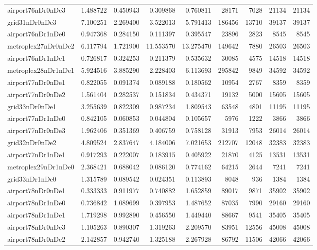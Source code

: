 \begin{longtable}{|l|r|r|r|r|r|r|r|r|}
airport76nDr0nDe3 & 1.488722 & 0.450943 & 0.309868 & 0.760811 & 28171 & 7028 & 21134 & 21134 \\
grid31nDr0nDe3 & 7.100251 & 2.269400 & 3.522013 & 5.791413 & 186456 & 13710 & 39137 & 39137 \\
airport76nDr1nDe0 & 0.947368 & 0.284150 & 0.111397 & 0.395547 & 23896 & 2823 & 8545 & 8545 \\
metroplex27nDr0nDe2 & 6.117794 & 1.721900 & 11.553570 & 13.275470 & 149642 & 7880 & 26503 & 26503 \\
airport76nDr1nDe1 & 0.726817 & 0.324253 & 0.211379 & 0.535632 & 30085 & 4575 & 14518 & 14518 \\
metroplex28nDr1nDe1 & 5.924516 & 3.885290 & 2.228403 & 6.113693 & 295842 & 9849 & 34592 & 34592 \\
airport77nDr0nDe1 & 0.822055 & 0.091374 & 0.089188 & 0.180562 & 10954 & 2767 & 8359 & 8359 \\
airport77nDr0nDe2 & 1.561404 & 0.282537 & 0.151834 & 0.434371 & 19132 & 5000 & 15605 & 15605 \\
grid33nDr0nDe1 & 3.255639 & 0.822309 & 0.987234 & 1.809543 & 63548 & 4801 & 11195 & 11195 \\
airport77nDr1nDe0 & 0.842105 & 0.060853 & 0.044804 & 0.105657 & 5976 & 1222 & 3866 & 3866 \\
airport77nDr0nDe3 & 1.962406 & 0.351369 & 0.406759 & 0.758128 & 31913 & 7953 & 26014 & 26014 \\
grid32nDr0nDe2 & 4.809524 & 2.837647 & 4.184006 & 7.021653 & 212707 & 12048 & 32383 & 32383 \\
airport77nDr1nDe1 & 0.917293 & 0.222007 & 0.183915 & 0.405922 & 21870 & 4125 & 13531 & 13531 \\
metroplex29nDr1nDe0 & 2.368421 & 0.688042 & 0.086120 & 0.774162 & 64215 & 2644 & 7241 & 7241 \\
grid33nDr1nDe0 & 1.315789 & 0.089542 & 0.024351 & 0.113893 & 8048 & 936 & 1384 & 1384 \\
airport78nDr0nDe1 & 0.333333 & 0.911977 & 0.740882 & 1.652859 & 89017 & 9871 & 35902 & 35902 \\
airport78nDr1nDe0 & 0.736842 & 1.089699 & 0.397953 & 1.487652 & 87035 & 7990 & 29160 & 29160 \\
airport78nDr1nDe1 & 1.719298 & 0.992890 & 0.456550 & 1.449440 & 88667 & 9541 & 35405 & 35405 \\
airport78nDr0nDe3 & 1.105263 & 0.890307 & 1.319263 & 2.209570 & 83951 & 12556 & 45008 & 45008 \\
airport78nDr0nDe2 & 2.142857 & 0.942740 & 1.325188 & 2.267928 & 86792 & 11506 & 42066 & 42066 \\

\end{longtable}

